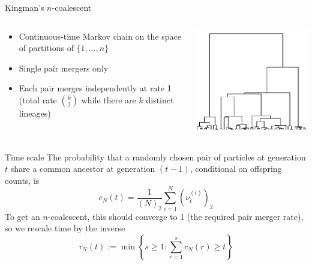 \documentclass[aspectratio=169]{beamer}
\theoremstyle{definition}
\newcommand{\vt}[2][t]{\nu_{#1}^{(#2)}}
\begin{document}
\begin{frame}{Kingman's $n$-coalescent}
\begin{columns}
\begin{column}{0.45\textwidth}
\begin{itemize}
\item Continuous-time Markov chain on the space of partitions of $\{1,\dots,n\}$
\item Single pair mergers only
\item Each pair merges independently at rate 1 (total rate $\binom{k}{2}$ while there are $k$ distinct lineages)
\end{itemize}
\end{column}
\begin{column}{0.45\textwidth}
\includegraphics[width=\textwidth]{kingman.png}
\end{column}
\end{columns}
\end{frame}


\begin{frame}{Time scale}
The probability that a randomly chosen pair of particles at generation $t$ share a common ancestor at generation $(t-1)$, conditional on offspring counts, is
\begin{equation*}
c_N(t) = \frac{1}{(N)_2} \sum_{i=1}^N (\vt{i})_2
\end{equation*}
To get an $n$-coalescent, this should converge to 1 (the required pair merger rate),
so we rescale time by the inverse
\begin{equation*}
\tau_N(t) := \min\left\{ s\geq 1 : \sum_{r=1}^s c_N(r) \geq t \right\}
\end{equation*}

\end{frame}
\end{document}
